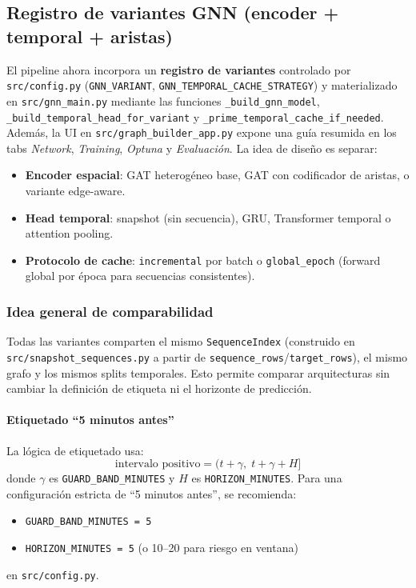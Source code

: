 \subsection{Registro de variantes GNN (encoder + temporal + aristas)}
\label{sec:gnn_variantes}
El pipeline ahora incorpora un \textbf{registro de variantes} controlado por
\texttt{src/config.py} (\texttt{GNN\_VARIANT}, \texttt{GNN\_TEMPORAL\_CACHE\_STRATEGY})
y materializado en \texttt{src/gnn\_main.py} mediante las funciones
\texttt{\_build\_gnn\_model}, \texttt{\_build\_temporal\_head\_for\_variant} y
\texttt{\_prime\_temporal\_cache\_if\_needed}. Adem\'as, la UI en
\texttt{src/graph\_builder\_app.py} expone una gu\'ia resumida en los tabs
\emph{Network}, \emph{Training}, \emph{Optuna} y \emph{Evaluaci\'on}. La idea de dise\~no es separar:
\begin{itemize}[leftmargin=*]
  \item \textbf{Encoder espacial}: GAT heterog\'eneo base, GAT con codificador de aristas, o variante edge-aware.
  \item \textbf{Head temporal}: snapshot (sin secuencia), GRU, Transformer temporal o attention pooling.
  \item \textbf{Protocolo de cache}: \texttt{incremental} por batch o \texttt{global\_epoch} (forward global por \'epoca para secuencias consistentes).
\end{itemize}

\subsubsection{Idea general de comparabilidad}
Todas las variantes comparten el mismo \texttt{SequenceIndex} (construido en
\texttt{src/snapshot\_sequences.py} a partir de \texttt{sequence\_rows}/\texttt{target\_rows}),
el mismo grafo y los mismos splits temporales. Esto permite comparar arquitecturas sin cambiar
la definici\'on de etiqueta ni el horizonte de predicci\'on.

\paragraph{Etiquetado ``5 minutos antes''}
La l\'ogica de etiquetado usa:
\[
\text{intervalo positivo} = (t+\gamma,\; t+\gamma+H]
\]
donde \(\gamma\) es \texttt{GUARD\_BAND\_MINUTES} y \(H\) es \texttt{HORIZON\_MINUTES}.
Para una configuraci\'on estricta de ``5 minutos antes'', se recomienda:
\begin{itemize}[leftmargin=*]
  \item \texttt{GUARD\_BAND\_MINUTES = 5}
  \item \texttt{HORIZON\_MINUTES = 5} (o 10--20 para riesgo en ventana)
\end{itemize}
en \texttt{src/config.py}.

